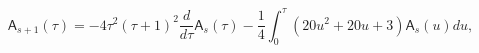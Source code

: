 \[\mathsf{A}_{s+1}(\tau)=-4\tau^{2}(\tau+1)^{2}\frac{d}{d\tau}\mathsf{A}_{s}(%
\tau)-\frac{1}{4}\int_{0}^{\tau}\left(20u^{2}+20u+3\right)\mathsf{A}_{s}(u)du,\]